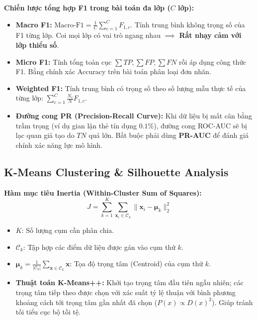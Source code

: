 \documentclass[10pt,a4paper]{article}
\begin{document}
\textbf{Chiến lược tổng hợp F1 trong bài toán đa lớp ($C$ lớp):}
\begin{itemize}[leftmargin=*]
    \item \textbf{Macro F1:} $\text{Macro-F1} = \frac{1}{C} \sum_{c=1}^C F_{1, c}$. Tính trung bình không trọng số của F1 từng lớp. Coi mọi lớp có vai trò ngang nhau $\implies$ \textbf{Rất nhạy cảm với lớp thiểu số}.
    \item \textbf{Micro F1:} Tính tổng toàn cục $\sum TP, \sum FP, \sum FN$ rồi áp dụng công thức F1. Bằng chính xác Accuracy trên bài toán phân loại đơn nhãn.
    \item \textbf{Weighted F1:} Tính trung bình có trọng số theo số lượng mẫu thực tế của từng lớp: $\sum_{c=1}^C \frac{N_c}{N} F_{1, c}$.
    \item \textbf{Đường cong PR (Precision-Recall Curve):} Khi dữ liệu bị mất cân bằng trầm trọng (ví dụ gian lận thẻ tín dụng $0.1\%$), đường cong ROC-AUC sẽ bị lạc quan giả tạo do $TN$ quá lớn. Bắt buộc phải dùng \textbf{PR-AUC} để đánh giá chính xác năng lực mô hình.
\end{itemize}

\subsection{K-Means Clustering \& Silhouette Analysis}
\textbf{Hàm mục tiêu Inertia (Within-Cluster Sum of Squares):}
\begin{equation}
    J = \sum_{k=1}^K \sum_{\mathbf{x}_i \in \mathcal{C}_k} \|\mathbf{x}_i - \boldsymbol{\mu}_k\|_2^2
\end{equation}
\begin{itemize}[leftmargin=*]
    \item $K$: Số lượng cụm cần phân chia.
    \item $\mathcal{C}_k$: Tập hợp các điểm dữ liệu được gán vào cụm thứ $k$.
    \item $\boldsymbol{\mu}_k = \frac{1}{|\mathcal{C}_k|} \sum_{\mathbf{x} \in \mathcal{C}_k} \mathbf{x}$: Tọa độ trọng tâm (Centroid) của cụm thứ $k$.
    \item \textbf{Thuật toán K-Means++:} Khởi tạo trọng tâm đầu tiên ngẫu nhiên; các trọng tâm tiếp theo được chọn với xác suất tỷ lệ thuận với bình phương khoảng cách tới trọng tâm gần nhất đã chọn ($P(x) \propto D(x)^2$). Giúp tránh tối tiểu cục bộ tồi tệ.
\end{itemize}
\end{document}
